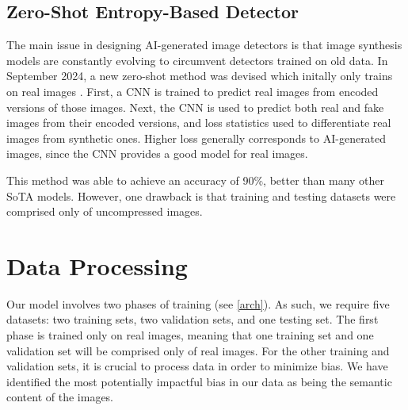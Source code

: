 \documentclass{article} %
\begin{document}
\subsection{Zero-Shot Entropy-Based Detector}
\label{ZED}

The main issue in designing AI-generated image detectors is that image synthesis models are constantly evolving to circumvent detectors trained on old data. In September 2024, a new zero-shot method was devised which initally only trains on real images \citep{cozzolino2024zeroshotdetectionaigeneratedimages}. First, a CNN is trained to predict real images from encoded versions of those images. Next, the CNN is used to predict both real and fake images from their encoded versions, and loss statistics used to differentiate real images from synthetic ones. Higher loss generally corresponds to AI-generated images, since the CNN provides a good model for real images.

This method was able to achieve an accuracy of 90\%, better than many other SoTA models. However, one drawback is that training and testing datasets were comprised only of uncompressed images.

\section{Data Processing}
\label{data}
Our model involves two phases of training (see \ref{arch}). As such, we require five datasets: two training sets, two validation sets, and one testing set. The first phase is trained only on real images, meaning that one training set and one validation set will be comprised only of real images. For the other training and validation sets, it is crucial to process data in order to minimize bias. We have identified the most potentially impactful bias in our data as being the semantic content of the images.
\end{document}
